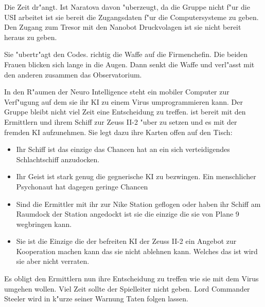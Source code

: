 Die Zeit dr"angt. Ist Naratova davon "uberzeugt, da\3 die Gruppe nicht f"ur die USI arbeitet ist sie bereit \ml{} die Zugangsdaten f"ur die Computersysteme zu geben. Den Zugang zum Tresor mit den Nanobot Druckvolagen ist sie nicht bereit heraus zu geben.


Sie "ubertr"agt \ml{} den Codes. \xl{} richtig die Waffe auf die Firmenchefin. Die beiden Frauen blicken sich lange in die Augen. Dann senkt \xl{} die Waffe und verl"asst mit den anderen zusammen das Observatorium.

In den R"aumen der Neuro Intelligence steht \ml{} ein mobiler Computer zur Verf"ugung auf dem sie ihr KI zu einem Virus umprogrammieren kann. Der Gruppe bleibt nicht viel Zeit eine Entscheidung zu treffen. \xl{} ist bereit mit den Ermittlern und ihrem Schiff zur Zeuss II-2 "uber zu setzen und es mit der fremden KI aufzunehmen. Sie legt dazu ihre Karten offen auf den Tisch:

\begin{itemize}
	\item Ihr Schiff ist das einzige das Chancen hat an ein sich verteidigendes Schlachtschiff anzudocken.
	\item Ihr Geist ist stark genug die gegnerische KI zu bezwingen. Ein menschlicher Psychonaut hat dagegen geringe Chancen
	\item Sind die Ermittler mit ihr zur Nike Station geflogen oder haben ihr Schiff am Raumdock der Station angedockt ist sie die einzige 
		die sie von Plane 9 wegbringen kann.
	\item Sie ist die Einzige die der befreiten KI der Zeuss II-2 ein Angebot zur Kooperation machen kann das sie nicht ablehnen kann. 
		Welches das ist wird sie aber nicht verraten.
\end{itemize}

Es obligt den Ermittlern nun ihre Entscheidung zu treffen wie sie mit dem Virus umgehen wollen. Viel Zeit sollte der Spielleiter nicht geben. Lord Commander Steeler wird in k"urze seiner Warnung Taten folgen lassen.

\vfill
\newpage


